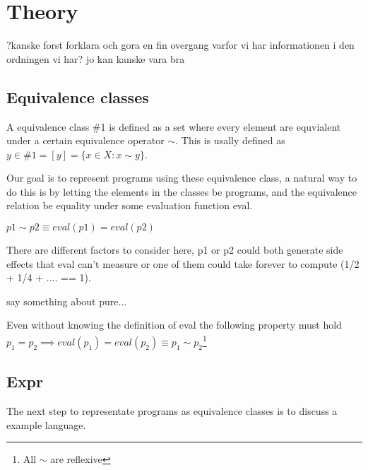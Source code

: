 

\newcommand{\defBNF}[4] {\text{#1}\quad&#2&::=&\;#3&\text{#4}}
\newcommand{\defaltBNF}[2] {&&|&\;#1&\text{#2}} 

\section{Theory}

?kanske forst forklara och gora en fin overgang varfor vi har informationen i den ordningen vi har?
jo kan kanske vara bra
\subsection{Equivalence classes}


A equivalence class \#1 is defined as a set where every element are equvialent under a certain equivalence operator $\sim$. This is usally defined as 
$y \in\#1 = [y] = \{x \in X : x \sim y\}$.

Our goal is to represent programs using these equivalence class, a natural way to do this is by letting the elements in the classes be programs, and the equivalence relation be equality under some evaluation function eval.

$p1 \sim p2 \equiv eval(p1) = eval(p2)$

There are different factors to consider here, p1 or p2 could both generate side effects that eval can't measure or one of them could take forever to compute (1/2 + 1/4 + .... == 1).

say something about pure...

Even without knowing the definition of eval the following property must hold
$p_1 = p_2 \implies eval(p_1) = eval(p_2) \equiv p_1 \sim p_2$\footnote{All $\sim$ are reflexive}



\subsection{Expr}

The next step to representate programs as equivalence classes is to discuss a example language. 

